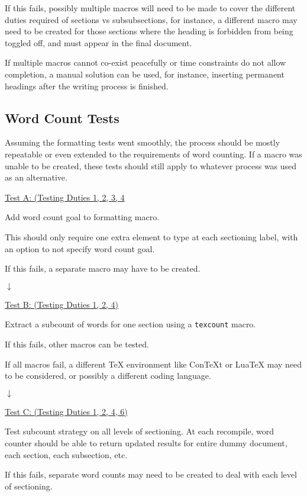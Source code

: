 \documentclass[12pt]{article}
\begin{document}
If this fails, possibly multiple macros will need to be made to cover the different duties required of sections vs subsubsections, for instance, a different macro may need to be created for those sections where the heading is forbidden from being toggled off, and must appear in the final document.

If multiple macros cannot co-exist peacefully or time constraints do not allow completion, a manual solution can be used, for instance, inserting permanent headings after the writing process is finished.

\vspace{2em}
\subsection*{Word Count Tests}

Assuming the formatting tests went smoothly, the process should be mostly repeatable or even extended to the requirements of word counting. If a macro was unable to be created, these tests should still apply to whatever process was used as an alternative.

\underline{Test A: (Testing Duties 1, 2, 3, 4}

Add word count goal to formatting macro.

This should only require one extra element to type at each sectioning label, with an option to not specify word count goal.

If this fails, a separate macro may have to be created.

$\downarrow$

\underline{Test B: (Testing Duties 1, 2, 4)}

Extract a subcount of words for one section using a \texttt{texcount} macro.

If this fails, other macros can be tested.

If all macros fail, a different TeX environment like ConTeXt or LuaTeX may need to be considered, or possibly a different coding language. 

$\downarrow$

\underline{Test C: (Testing Duties 1, 2, 4, 6)}

Test subcount strategy on all levels of sectioning. At each recompile, word counter should be able to return updated results for entire dummy document, each section, each subsection, etc.

If this fails, separate word counts may need to be created to deal with each level of sectioning.
\end{document}
